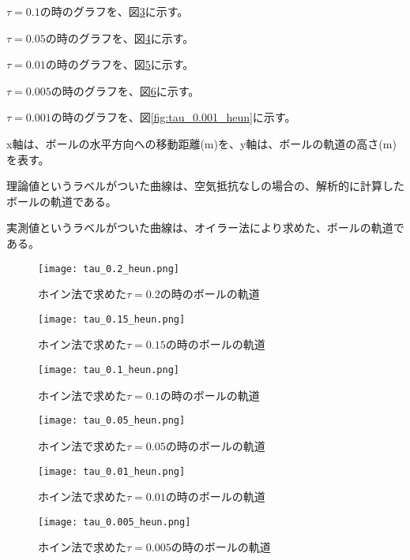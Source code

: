 \documentclass[a4paper, 11pt, titlepage]{jsarticle}
\begin{document}
$\tau = 0.1$の時のグラフを、図\ref{fig:tau_0.1_heun}に示す。

$\tau = 0.05$の時のグラフを、図\ref{fig:tau_0.05_heun}に示す。

$\tau = 0.01$の時のグラフを、図\ref{fig:tau_0.01_heun}に示す。

$\tau = 0.005$の時のグラフを、図\ref{fig:tau_0.005_heun}に示す。

$\tau = 0.001$の時のグラフを、図\ref{fig:tau_0.001_heun}に示す。

x軸は、ボールの水平方向への移動距離(m)を、y軸は、ボールの軌道の高さ(m)を表す。

理論値というラベルがついた曲線は、空気抵抗なしの場合の、解析的に計算したボールの軌道である。

実測値というラベルがついた曲線は、オイラー法により求めた、ボールの軌道である。

\begin{figure}[H]
	\centering
	\texttt{[image: tau\_0.2\_heun.png]}
	\caption{ホイン法で求めた$\tau = 0.2$の時のボールの軌道}
	\label{fig:tau_0.2_heun}
\end{figure}

\begin{figure}[H]
	\centering
	\texttt{[image: tau\_0.15\_heun.png]}
	\caption{ホイン法で求めた$\tau = 0.15$の時のボールの軌道}
	\label{fig:tau_0.15_heun}
\end{figure}

\begin{figure}[H]
	\centering
	\texttt{[image: tau\_0.1\_heun.png]}
	\caption{ホイン法で求めた$\tau = 0.1$の時のボールの軌道}
	\label{fig:tau_0.1_heun}
\end{figure}

\begin{figure}[H]
	\centering
	\texttt{[image: tau\_0.05\_heun.png]}
	\caption{ホイン法で求めた$\tau = 0.05$の時のボールの軌道}
	\label{fig:tau_0.05_heun}
\end{figure}

\begin{figure}[H]
	\centering
	\texttt{[image: tau\_0.01\_heun.png]}
	\caption{ホイン法で求めた$\tau = 0.01$の時のボールの軌道}
	\label{fig:tau_0.01_heun}
\end{figure}

\begin{figure}[H]
	\centering
	\texttt{[image: tau\_0.005\_heun.png]}
	\caption{ホイン法で求めた$\tau = 0.005$の時のボールの軌道}
	\label{fig:tau_0.005_heun}
\end{figure}
\end{document}
